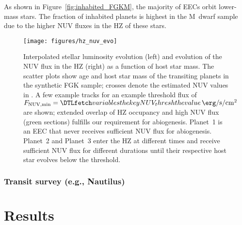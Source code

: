 \documentclass[twocolumn,twocolappendix,linenumbers]{aastex631}
\begin{document}
As shown in Figure~\ref{fig:inhabited_FGKM}, the majority of \glspl{EEC} orbit lower-mass stars.
The fraction of inhabited planets is highest in the M~dwarf sample due to the higher \gls{NUV} fluxes in the \gls{HZ} of these stars.


\begin{figure*}
    \begin{centering}
        \texttt{[image: figures/hz\_nuv\_evo]}
        \caption{Interpolated stellar luminosity evolution (left) and evolution of the \gls{NUV} flux in the \gls{HZ} (right) as a function of host star mass.
        The scatter plots show age and host star mass of the transiting planets in the synthetic FGK sample; crosses denote the estimated \gls{NUV} values in \citet{Richey-Yowell2019}. %
        A few example tracks for an example threshold flux of $F_\mathrm{NUV, min} = \var{NUV_thresh}\,\SI{}{\erg\per\second\per\centi\meter\squared}$ are shown; extended overlap of \gls{HZ} occupancy and high \gls{NUV} flux (green sections) fulfills our requirement for abiogenesis.
        Planet~1 is an \gls{EEC} that never receives sufficient \gls{NUV} flux for abiogenesis.
        Planet~2 and Planet~3 enter the \gls{HZ} at different times and receive sufficient \gls{NUV} flux for different durations until their respective host star evolves below the threshold.
        }
        \label{fig:hz_nuv_evo}
    \end{centering}
\end{figure*}





\subsubsection{Transit survey (e.g., Nautilus)}







\section{Results}
\label{sec:results}
\end{document}
